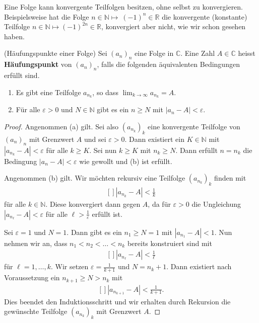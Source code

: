 \documentclass[../Analysis1_script.tex]{subfiles}
\begin{document}
Eine Folge kann konvergente Teilfolgen besitzen, ohne selbst zu konvergieren. Beispielsweise hat die Folge $n \in \mathbb {N} \mapsto \ (-1)^n \in \mathbb {R}$ die konvergente (konstante) Teilfolge $n \in \mathbb {N} \mapsto (-1)^{2n}\in \mathbb {R}$, konvergiert aber nicht, wie wir schon gesehen haben. 

\begin{proposition}{(Häufungspunkte einer Folge)}
	Sei $(a_n)_n$ eine Folge in $\mathbb {C}$. Eine Zahl $A \in \mathbb {C}$ heisst \textbf{Häufungspunkt} von $(a_n)_n$, falls die folgenden äquivalenten Bedingungen erfüllt sind.
	\begin{enumerate}
		\item Es gibt eine Teilfolge $a_{n_k}$, so dass $\lim _{k \to \infty }a_{n_k} = A$. 
		\item Für alle $\varepsilon >0$ und $N\in \mathbb {N}$ gibt es ein $n\geq N$ mit $|a_n-A|<\varepsilon$.
	\end{enumerate} 
\end{proposition}

\begin{proof}
	Angenommen (a) gilt. Sei also $(a_{n_k})_k$ eine konvergente Teilfolge von $(a_n)_n$ mit Grenzwert $A$ und sei $\varepsilon > 0$. Dann existiert ein $K\in \mathbb {N}$ mit $|a_{n_k}-A|<\varepsilon$ für alle $k \geq K$. Sei nun $k \geq K$ mit $n_k \geq N$. Dann erfüllt $n = n_k$ die Bedingung $|a_{n}-A|<\varepsilon$ wie gewollt und (b) ist erfüllt.
	
	Angenommen (b) gilt. Wir möchten rekursiv eine Teilfolge $(a_{n_k})_k$ finden mit
	\[\begin{aligned}[]
		|a_{n_k}-A| < \frac {1}{k}
	\end{aligned}\]
	für alle $k\in \mathbb {N}$. Diese konvergiert dann gegen $A$, da für $\varepsilon >0$ die Ungleichung $|a_{n_\ell }-A| < \varepsilon$ für alle $\ell > \frac {1}{\varepsilon }$ erfüllt ist.
	
	Sei $\varepsilon = 1$ und $N=1$. Dann gibt es ein $n_1 \geq N=1$ mit $|a_{n_1}-A|<1$. Nun nehmen wir an, dass $n_1<n_2 < \ldots <n_k$ bereits konstruiert sind mit
	\[\begin{aligned}[]
		|a_{n_\ell }-A| < \frac {1}{\ell }
	\end{aligned}\]
	für $\ell =1, \ldots , k$. Wir setzen $\varepsilon = \frac {1}{k+1}$ und $N = n_k+1$. Dann existiert nach Voraussetzung ein $n_{k+1} \geq N > n_k$ mit
	\[\begin{aligned}[]
		|a_{n_{k+1}}-A| < \frac {1}{k+1}.
	\end{aligned}\] 
	Dies beendet den Induktionsschritt und wir erhalten durch Rekursion die gewünschte Teilfolge $(a_{n_k})_k$ mit Grenzwert $A$. 
\end{proof}
\end{document}
